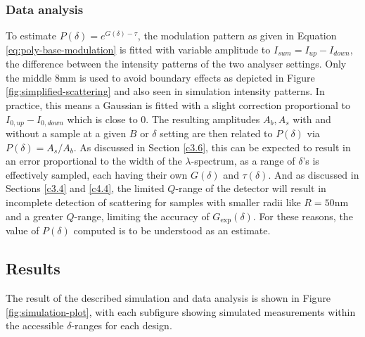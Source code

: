 \documentclass{article}
\begin{document}
\subsubsection{Data analysis}
To estimate $P(\delta) = e^{G(\delta)  - \tau}$, the modulation pattern as given in Equation \eqref{eq:poly-base-modulation} is fitted with variable amplitude to $I_{sum} = I_{up} - I_{down}$, the difference between the intensity patterns of the two analyser settings. Only the middle $8\unit{\milli\meter}$ is used to avoid boundary effects as depicted in Figure \ref{fig:simplified-scattering} and also seen in simulation intensity patterns. In practice, this means a Gaussian is fitted with a slight correction proportional to $I_{0,up} - I_{0,down}$ which is close to $0$. The resulting amplitudes $A_b, A_s$ with and without a sample at a given $B$ or $\delta$ setting are then related to $P(\delta)$ via $P(\delta) = A_s/A_b$. As discussed in Section \ref{c3.6}, this can be expected to result in an error proportional to the width of the $\lambda$-spectrum, as a range of $\delta$'s is effectively sampled, each having their own $G(\delta)$ and $\tau(\delta)$. And as discussed in Sections \ref{c3.4} and \ref{c4.4}, the limited $Q$-range of the detector will result in incomplete detection of scattering for samples with smaller radii like $R = 50 \unit{\nano\meter}$ and a greater $Q$-range, limiting the accuracy of $G_\text{exp}(\delta)$. For these reasons, the value of $P(\delta)$ computed is to be understood as an estimate.  
\subsection{Results}
The result of the described simulation and data analysis is shown in Figure \ref{fig:simulation-plot}, with each subfigure showing simulated measurements within the accessible $\delta$-ranges for each design.
\end{document}
